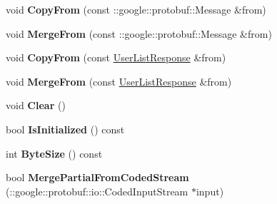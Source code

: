 \begin{DoxyCompactItemize}
\item 
\hypertarget{classSimpleChat_1_1UserListResponse_af4f196b33d7cde3cbc29e5b4aca712b4}{void {\bfseries Copy\-From} (const \-::google\-::protobuf\-::\-Message \&from)}\label{classSimpleChat_1_1UserListResponse_af4f196b33d7cde3cbc29e5b4aca712b4}

\item 
\hypertarget{classSimpleChat_1_1UserListResponse_a2debc0c0b90687b53970c24f2eb2ea0e}{void {\bfseries Merge\-From} (const \-::google\-::protobuf\-::\-Message \&from)}\label{classSimpleChat_1_1UserListResponse_a2debc0c0b90687b53970c24f2eb2ea0e}

\item 
\hypertarget{classSimpleChat_1_1UserListResponse_a4f43f27a16728fb3e316123c4c181892}{void {\bfseries Copy\-From} (const \hyperlink{classSimpleChat_1_1UserListResponse}{User\-List\-Response} \&from)}\label{classSimpleChat_1_1UserListResponse_a4f43f27a16728fb3e316123c4c181892}

\item 
\hypertarget{classSimpleChat_1_1UserListResponse_aa4ab8470fb47c0c792b6950efea555e7}{void {\bfseries Merge\-From} (const \hyperlink{classSimpleChat_1_1UserListResponse}{User\-List\-Response} \&from)}\label{classSimpleChat_1_1UserListResponse_aa4ab8470fb47c0c792b6950efea555e7}

\item 
\hypertarget{classSimpleChat_1_1UserListResponse_a8b34e9384998f73e4edc7956925566d7}{void {\bfseries Clear} ()}\label{classSimpleChat_1_1UserListResponse_a8b34e9384998f73e4edc7956925566d7}

\item 
\hypertarget{classSimpleChat_1_1UserListResponse_a062c71b80549b7ec68d7d53c7a4c4b26}{bool {\bfseries Is\-Initialized} () const }\label{classSimpleChat_1_1UserListResponse_a062c71b80549b7ec68d7d53c7a4c4b26}

\item 
\hypertarget{classSimpleChat_1_1UserListResponse_af8d8db17515cc8a05428636db1667f33}{int {\bfseries Byte\-Size} () const }\label{classSimpleChat_1_1UserListResponse_af8d8db17515cc8a05428636db1667f33}

\item 
\hypertarget{classSimpleChat_1_1UserListResponse_a070121c5d035b79d64ef1c1d4478a667}{bool {\bfseries Merge\-Partial\-From\-Coded\-Stream} (\-::google\-::protobuf\-::io\-::\-Coded\-Input\-Stream $\ast$input)}\label{classSimpleChat_1_1UserListResponse_a070121c5d035b79d64ef1c1d4478a667}


\end{DoxyCompactItemize}
